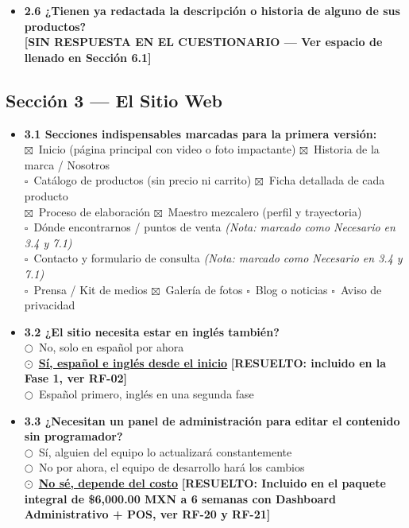 \documentclass[11pt,letterpaper]{article}
\newcommand{\uchk}{$\square$}
\newcommand{\chk}{\textcolor{mezcalAgave}{$\boxtimes$}}
\newcommand{\uradio}{$\bigcirc$}
\newcommand{\radio}{\textcolor{mezcalAgave}{\textbf{$\odot$}}}
\begin{document}
\begin{itemize}[leftmargin=1.5em]
    \item \textbf{2.6 ¿Tienen ya redactada la descripción o historia de alguno de sus productos?}\\
    \textcolor{red!80!black}{\textbf{[SIN RESPUESTA EN EL CUESTIONARIO — Ver espacio de llenado en Sección 6.1]}}
\end{itemize}

\subsection{Sección 3 — El Sitio Web}
\begin{itemize}[leftmargin=1.5em]
    \item \textbf{3.1 Secciones indispensables marcadas para la primera versión:}\\
    \chk\ Inicio (página principal con video o foto impactante) \quad
    \chk\ Historia de la marca / Nosotros \\
    \uchk\ Catálogo de productos (sin precio ni carrito) \quad
    \chk\ Ficha detallada de cada producto \\
    \chk\ Proceso de elaboración \quad
    \chk\ Maestro mezcalero (perfil y trayectoria) \\
    \uchk\ Dónde encontrarnos / puntos de venta \textit{(Nota: marcado como Necesario en 3.4 y 7.1)} \\
    \uchk\ Contacto y formulario de consulta \textit{(Nota: marcado como Necesario en 3.4 y 7.1)} \\
    \uchk\ Prensa / Kit de medios \quad
    \chk\ Galería de fotos \quad
    \uchk\ Blog o noticias \quad
    \uchk\ Aviso de privacidad

    \item \textbf{3.2 ¿El sitio necesita estar en inglés también?}\\
    \uradio\ No, solo en español por ahora\\
    \radio\ \underline{\textbf{Sí, español e inglés desde el inicio}} \quad \textcolor{mezcalAgave}{\textbf{[RESUELTO: incluido en la Fase 1, ver RF-02]}}\\
    \uradio\ Español primero, inglés en una segunda fase

    \item \textbf{3.3 ¿Necesitan un panel de administración para editar el contenido sin programador?}\\
    \uradio\ Sí, alguien del equipo lo actualizará constantemente\\
    \uradio\ No por ahora, el equipo de desarrollo hará los cambios\\
    \radio\ \underline{\textbf{No sé, depende del costo}} \quad \textcolor{mezcalAgave}{\textbf{[RESUELTO: Incluido en el paquete integral de \$6,000.00 MXN a 6 semanas con Dashboard Administrativo + POS, ver RF-20 y RF-21]}}\


\end{itemize}
\end{document}
